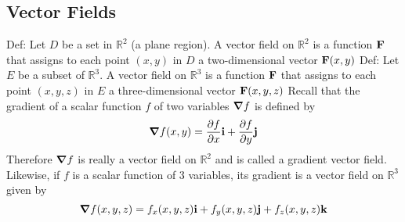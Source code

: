 \documentclass{article}
\begin{document}
        

    \subsection{Vector Fields} %
    \begin{outline}
        \1 Def: Let $D$ be a set in \(\mathbb R^2\) (a plane region). A vector field on \(\mathbb R^2\) is a function \(\vb F\) that assigns to each point \((x,y)\) in $D$ a two-dimensional vector \(\vb F(x,y)\)
        \1 Def: Let $E$ be a subset of \(\mathbb R^3\). A vector field on \(\mathbb R^3\) is a function \(\vb F\) that assigns to each point \((x,y,z)\) in $E$ a three-dimensional vector \(\vb F(x,y,z)\)
        \1 Recall that the gradient of a scalar function $f$ of two variables \(\grad f\) is defined by \[\grad f(x,y)=\pdv{f}{x}\vb i+\pdv{f}{y}\vb j\] Therefore \(\grad f\) is really a vector field on \(\mathbb R^2\) and is called a gradient vector field. Likewise, if $f$ is a scalar function of 3 variables, its gradient is a vector field on \(\mathbb R^3\) given by \[\grad f(x,y,z)=f_x(x,y,z)\vb i+f_y(x,y,z)\vb j+f_z(x,y,z)\vb k\]
        
    \end{outline}    
\end{document}
